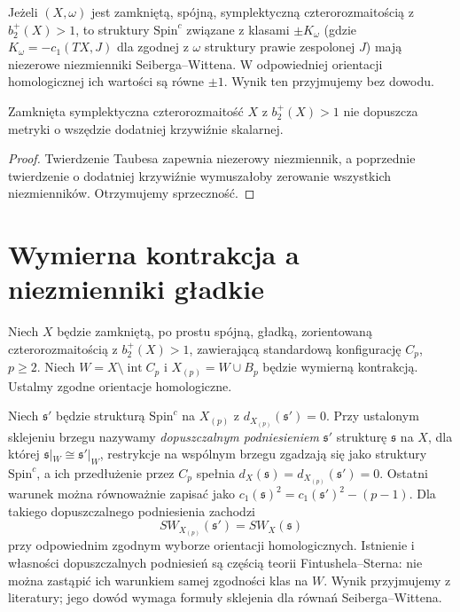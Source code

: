 \begin{twierdzenie}
\label{thm:tg-sw-taubes}
Jeżeli $(X,\omega)$ jest zamkniętą, spójną,
symplektyczną czterorozmaitością z $b_2^+(X)>1$,
to struktury $\mathrm{Spin}^c$ związane z klasami
$\pm K_\omega$ (gdzie $K_\omega=-c_1(TX,J)$ dla
zgodnej z $\omega$ struktury prawie zespolonej $J$)
mają niezerowe niezmienniki Seiberga--Wittena.
W odpowiedniej orientacji homologicznej ich wartości
są równe $\pm1$. Wynik ten przyjmujemy bez dowodu.
\end{twierdzenie}

\begin{wniosek}
Zamknięta symplektyczna czterorozmaitość
$X$ z $b_2^+(X)>1$ nie dopuszcza metryki o wszędzie
dodatniej krzywiźnie skalarnej.
\end{wniosek}

\begin{proof}
Twierdzenie Taubesa zapewnia niezerowy niezmiennik,
a poprzednie twierdzenie o dodatniej krzywiźnie
wymuszałoby zerowanie wszystkich niezmienników.
Otrzymujemy sprzeczność.
\end{proof}

\section{Wymierna kontrakcja a niezmienniki gładkie}
\label{sec:tg-sw-rb}

\begin{twierdzenie}
\label{thm:tg-sw-rbprinciple}
Niech $X$ będzie zamkniętą, po prostu spójną,
gładką, zorientowaną czterorozmaitością z
$b_2^+(X)>1$, zawierającą standardową konfigurację
$C_p$, $p\geq2$. Niech $W=X\setminus\operatorname{int}C_p$
i $X_{(p)}=W\cup B_p$ będzie wymierną kontrakcją.
Ustalmy zgodne orientacje homologiczne.

Niech $\mathfrak s'$ będzie strukturą $\mathrm{Spin}^c$
na $X_{(p)}$ z $d_{X_{(p)}}(\mathfrak s')=0$.
Przy ustalonym sklejeniu brzegu nazywamy
\emph{dopuszczalnym podniesieniem} $\mathfrak s'$
strukturę $\mathfrak s$ na $X$, dla której
$\mathfrak s|_W\cong\mathfrak s'|_W$, restrykcje na
wspólnym brzegu zgadzają się jako struktury
$\mathrm{Spin}^c$, a ich przedłużenie przez $C_p$
spełnia $d_X(\mathfrak s)=d_{X_{(p)}}(\mathfrak s')=0$.
Ostatni warunek można równoważnie zapisać jako
$c_1(\mathfrak s)^2=c_1(\mathfrak s')^2-(p-1)$.
Dla takiego dopuszczalnego podniesienia zachodzi
\[
SW_{X_{(p)}}(\mathfrak s')=SW_X(\mathfrak s)
\]
przy odpowiednim zgodnym wyborze orientacji homologicznych.
Istnienie i własności dopuszczalnych podniesień są częścią
teorii Fintushela--Sterna: nie można zastąpić ich
warunkiem samej zgodności klas na $W$.
Wynik przyjmujemy z literatury; jego dowód wymaga
formuły sklejenia dla równań Seiberga--Wittena.
\end{twierdzenie}

